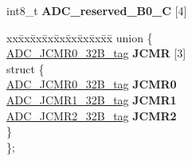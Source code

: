 \begin{DoxyCompactItemize}
\begin{tabbing}
\end{tabbing}\item 
\mbox{\label{structADC__struct__tag_a3e671d0008b5f592fc6ec3f932c31faa}} 
int8\+\_\+t {\bfseries A\+D\+C\+\_\+reserved\+\_\+B0\+\_\+C} \mbox{[}4\mbox{]}
\item 
\mbox{\label{structADC__struct__tag_a5d65e17fd1dd0305ab7e9bdc6f6d347f}} 
\begin{tabbing}
xx\=xx\=xx\=xx\=xx\=xx\=xx\=xx\=xx\=\kill
union \{\\
\>\mbox{\hyperlink{unionADC__JCMR0__32B__tag}{ADC\_JCMR0\_32B\_tag}} {\bfseries JCMR} \mbox{[}3\mbox{]}\\
\mbox{\label{unionADC__struct__tag_1_1_0D1828_a8f8afc7db6be3dbadefd590606e8d4af}} 
\>struct \{\\
\>\>\mbox{\hyperlink{unionADC__JCMR0__32B__tag}{ADC\_JCMR0\_32B\_tag}} {\bfseries JCMR0}\\
\>\>\mbox{\hyperlink{unionADC__JCMR1__32B__tag}{ADC\_JCMR1\_32B\_tag}} {\bfseries JCMR1}\\
\>\>\mbox{\hyperlink{unionADC__JCMR2__32B__tag}{ADC\_JCMR2\_32B\_tag}} {\bfseries JCMR2}\\
\>\} \\
\}; \\


\end{tabbing}
\end{DoxyCompactItemize}
